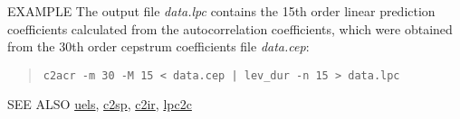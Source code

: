 \begin{options}
\end{options}

\begin{qsection}{EXAMPLE}
The output file {\em data.lpc} contains the 15th order linear prediction
coefficients calculated from the autocorrelation coefficients,
which were obtained from the 30th order cepstrum coefficients
file {\em data.cep}:
\begin{quote}
  \verb!c2acr -m 30 -M 15 < data.cep | lev_dur -n 15 > data.lpc!
\end{quote}
\end{qsection}

\begin{qsection}{SEE ALSO}
\hyperlink{uels}{uels},
\hyperlink{c2sp}{c2sp},
\hyperlink{c2ir}{c2ir},
\hyperlink{lpc2c}{lpc2c}
\end{qsection}
